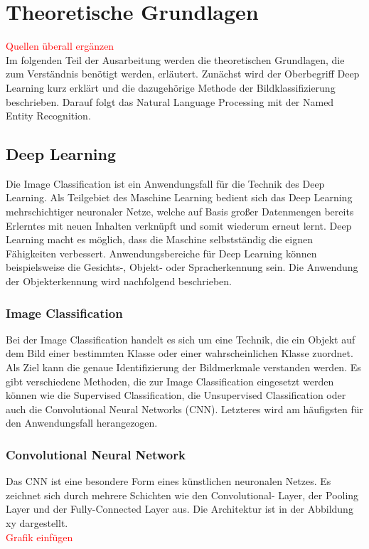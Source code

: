 \newpage
\section{Theoretische Grundlagen}
\textcolor{red}{Quellen überall ergänzen} \\
Im folgenden Teil der Ausarbeitung werden die theoretischen Grundlagen, die zum Verständnis benötigt werden, erläutert.
Zunächst wird der Oberbegriff Deep Learning kurz erklärt und die dazugehörige Methode der Bildklassifizierung beschrieben. Darauf folgt das Natural Language Processing mit der Named Entity Recognition.

\subsection{Deep Learning}

Die Image Classification ist ein Anwendungsfall für die Technik des Deep Learning.
Als Teilgebiet des Maschine Learning bedient sich das Deep Learning mehrschichtiger neuronaler Netze, welche auf Basis großer Datenmengen bereits Erlerntes mit neuen Inhalten verknüpft und somit wiederum erneut lernt. Deep Learning macht es möglich, dass die Maschine selbstständig die eignen Fähigkeiten verbessert.
Anwendungsbereiche für Deep Learning können beispielsweise die Gesichts-, Objekt- oder Spracherkennung sein. Die Anwendung der Objekterkennung wird nachfolgend beschrieben.

\subsubsection{Image Classification}
Bei der Image Classification handelt es sich um eine Technik, die ein Objekt auf dem Bild einer bestimmten Klasse oder einer wahrscheinlichen Klasse zuordnet. Als Ziel kann die genaue Identifizierung der Bildmerkmale verstanden werden.
Es gibt verschiedene Methoden, die zur Image Classification eingesetzt werden können wie die Supervised Classification, die Unsupervised Classification oder auch die Convolutional Neural Networks (CNN). Letzteres wird am häufigsten für den Anwendungsfall herangezogen.

\subsubsection{Convolutional Neural Network}
Das CNN ist eine besondere Form eines künstlichen neuronalen Netzes.
Es zeichnet sich durch mehrere Schichten wie den Convolutional- Layer, der Pooling Layer und der Fully-Connected Layer aus. Die Architektur ist in der Abbildung xy dargestellt.
\\
\textcolor{red}{Grafik einfügen} \\

